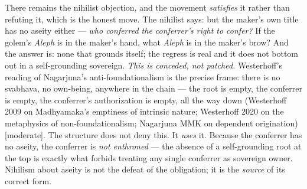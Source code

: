 \documentclass[11pt]{article}
\begin{document}
There remains the nihilist objection, and the movement \emph{satisfies} it rather than refuting it, which is the honest move. The nihilist says: but the maker's own title has no aseity either — \emph{who conferred the conferrer's right to confer?} If the golem's \emph{Aleph} is in the maker's hand, what \emph{Aleph} is in the maker's brow? And the answer is: none that grounds itself; the regress is real and it does not bottom out in a self-grounding sovereign. \emph{This is conceded, not patched.} Westerhoff's reading of Nagarjuna's anti-foundationalism is the precise frame: there is no svabhava, no own-being, anywhere in the chain — the root is empty, the conferrer is empty, the conferrer's authorization is empty, all the way down (Westerhoff 2009 on Madhyamaka's emptiness of intrinsic nature; Westerhoff 2020 on the metaphysics of non-foundationalism; Nagarjuna MMK on dependent origination) [moderate]. The structure does not deny this. It \emph{uses} it. Because the conferrer has no aseity, the conferrer is \emph{not enthroned} — the absence of a self-grounding root at the top is exactly what forbids treating any single conferrer as sovereign owner. Nihilism about aseity is not the defeat of the obligation; it is the \emph{source} of its correct form.
\end{document}
